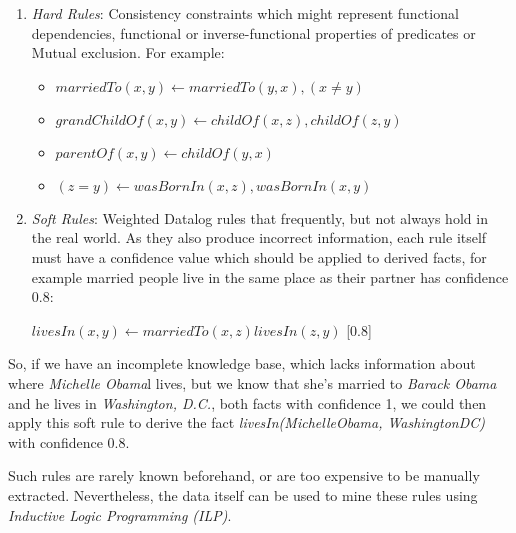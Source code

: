 \begin{enumerate}
 \item \emph{Hard Rules}: Consistency constraints which might represent functional dependencies, functional or inverse-functional properties of predicates or Mutual exclusion. For example:
    \begin{itemize}
      \item \begin{math} marriedTo(x,y) \leftarrow marriedTo(y,x),(x \neq y)\end{math}
      \item \begin{math} grandChildOf(x,y) \leftarrow childOf(x,z),childOf(z,y)\end{math}
      \item \begin{math} parentOf(x,y) \leftarrow childOf(y,x)\end{math}
      \item \begin{math} (z=y) \leftarrow wasBornIn(x,z),wasBornIn(x,y)\end{math}
    \end{itemize}

 \item \emph{Soft Rules}: Weighted Datalog rules that frequently, but not always hold in the real world. As they also
produce incorrect information, each rule itself must have a confidence value which should be applied to derived facts,
for example married people live in the same place as their partner has confidence 0.8:
    \begin{center}
      \begin{math} livesIn(x,y) \leftarrow marriedTo(x,z)livesIn(z,y)\end{math} [0.8]
    \end{center}
\end{enumerate}

So, if we have an incomplete knowledge base, which lacks information about where \emph{Michelle Obama}l lives, but
we know that she's married to \emph{Barack Obama} and he lives in \emph{Washington, D.C.}, both facts with confidence 1, we could then apply this soft rule to derive the fact \emph{livesIn(MichelleObama, WashingtonDC)} with confidence 0.8.

Such rules are rarely known beforehand, or are too expensive to be manually extracted. Nevertheless, the data itself can
be used to mine these rules using \emph{Inductive Logic Programming (ILP)}. 

